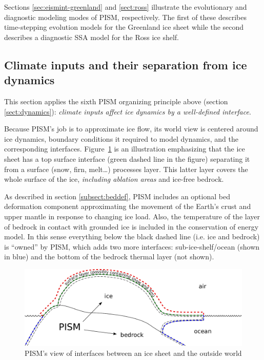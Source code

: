 \documentclass[11pt,final]{amsart}
\begin{document}
Sections \ref{sec:eismint-greenland} and \ref{sect:ross} illustrate the evolutionary and diagnostic modeling modes of PISM, respectively.  The first of these describes time-stepping evolution models for the Greenland ice sheet while the second describes a diagnostic SSA model for the Ross ice shelf.

\subsection{Climate inputs and their separation from ice dynamics}
\label{sec:climate-inputs}  This section applies the sixth PISM organizing principle above (section \ref{sect:dynamics}): \emph{climate inputs affect ice dynamics by a well-defined interface}.

Because PISM's job is to approximate ice flow, its world view is centered around ice dynamics, boundary conditions it required to model dynamics, and the corresponding interfaces.  Figure~\ref{fig:climate-inputs} is an illustration emphasizing that the ice sheet has a top surface interface (green dashed line in the figure) separating it from a surface (snow, firn, melt\dots) processes layer.  This latter layer covers the whole surface of the ice, \emph{including ablation areas} and ice-free bedrock.

As described in section \ref{subsect:beddef}, PISM includes an optional bed
deformation component approximating the movement of the Earth's crust and upper
mantle in response to changing ice load. Also, the temperature of the layer of
bedrock in contact with grounded ice is included in the conservation of energy
model. In this sense everything below the black dashed line (i.e. ice and
bedrock) is ``owned'' by PISM, which adds two more interfaces:
sub-ice-shelf/ocean (shown in blue) and the bottom of the bedrock thermal layer
(not shown).

\begin{figure}
  \centering
  \includegraphics[width=5in]{figs/climate_cartoon_new.pdf}
  \caption{PISM's view of interfaces between an ice sheet and the outside world}
  \label{fig:climate-inputs}
\end{figure}
\end{document}
